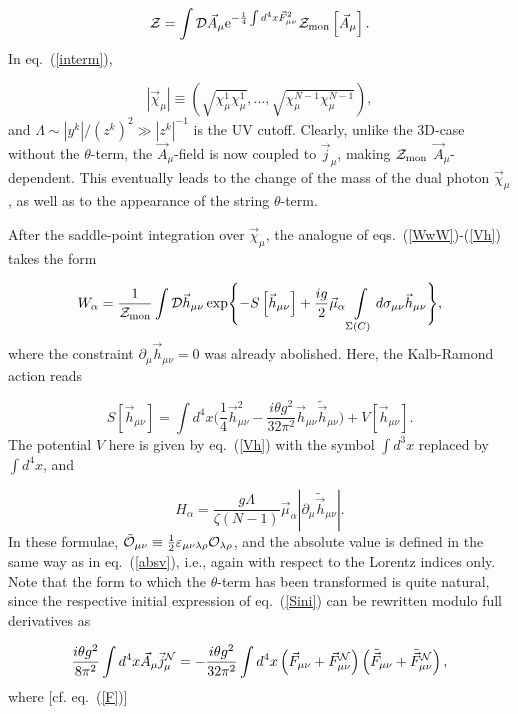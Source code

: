\documentclass[a4paper,12pt]{article}
\begin{document}
$${\cal Z}=\int {\cal D}\vec A_\mu{\rm e}^{-\frac14\int d^4x\vec F_{\mu\nu}^2}{\cal Z}_{\rm mon}\left[\vec A_\mu\right].$$
In eq.~(\ref{interm}),

\begin{equation}
\label{absv}
\left|\vec\chi_\mu\right|\equiv
\left(\sqrt{\chi_\mu^1\chi_\mu^1},\ldots,\sqrt{\chi_\mu^{N-1}\chi_\mu^{N-1}}\right),
\end{equation}
and $\Lambda\sim\left|y^k\right|/\left(z^k\right)^2
\gg \left|z^k\right|^{-1}$ is the UV cutoff.
Clearly, unlike the 3D-case without the $\theta$-term, the $\vec A_\mu$-field is now coupled to $\vec j_\mu$, making
${\cal Z}_{\rm mon}$ $\vec A_\mu$-dependent. This eventually leads to the change of the mass of the dual photon $\vec\chi_\mu$, as well
as to the appearance of the string $\theta$-term.

After the saddle-point integration over $\vec\chi_\mu$,
the analogue of eqs.~(\ref{WwW})-(\ref{Vh}) takes the form

\begin{equation}
\label{danuovo}
W_\alpha=
\frac{1}{{\cal Z}_{\rm mon}}
\int{\cal D}\vec h_{\mu\nu}
\exp\Biggl\{-S\left[\vec h_{\mu\nu}\right]
+\frac{ig}{2}\vec\mu_\alpha\int\limits_{\Sigma(C)}^{}d\sigma_{\mu\nu}\vec h_{\mu\nu}\Biggr\},
\end{equation}
where the constraint $\partial_\mu\vec h_{\mu\nu}=0$ was already abolished. Here, the Kalb-Ramond action reads

\begin{equation}
\label{fourkalb}
S\left[\vec h_{\mu\nu}\right]=\int d^4x\Biggl(\frac{1}{4}\vec h_{\mu\nu}^2-\frac{i\theta g^2}{32\pi^2}
\vec h_{\mu\nu}\tilde{\vec h}_{\mu\nu}\Biggr)+V\left[\vec h_{\mu\nu}\right].
\end{equation}
The potential $V$ here is given by eq.~(\ref{Vh}) with the symbol $\int d^3x$ replaced by $\int d^4x$, and


$$H_\alpha=\frac{g\Lambda}{\zeta(N-1)}\vec\mu_\alpha\left|\partial_\mu\tilde{\vec h}_{\mu\nu}\right|.$$
In these formulae,
$\tilde{\cal O}_{\mu\nu}\equiv\frac12\varepsilon_{\mu\nu\lambda\rho}
{\cal O}_{\lambda\rho}$,
and the absolute value is defined in the same way as in eq.~(\ref{absv}), i.e., again with respect to the Lorentz indices only.
Note that the form to which the $\theta$-term has been transformed is quite natural, since
the respective initial expression of eq.~(\ref{Sini}) can be rewritten modulo full derivatives as

$$
\frac{i\theta g^2}{8\pi^2}
\int d^4x\vec A_\mu\vec j_\mu^{\cal N}=-\frac{i\theta g^2}{32\pi^2}\int d^4x
\left(\vec F_{\mu\nu}+\vec F_{\mu\nu}^{\cal N}\right)\left(
\tilde{\vec F}_{\mu\nu}+\tilde{\vec F}_{\mu\nu}^{\cal N}\right),$$
where [cf. eq.~(\ref{F})]
\end{document}
